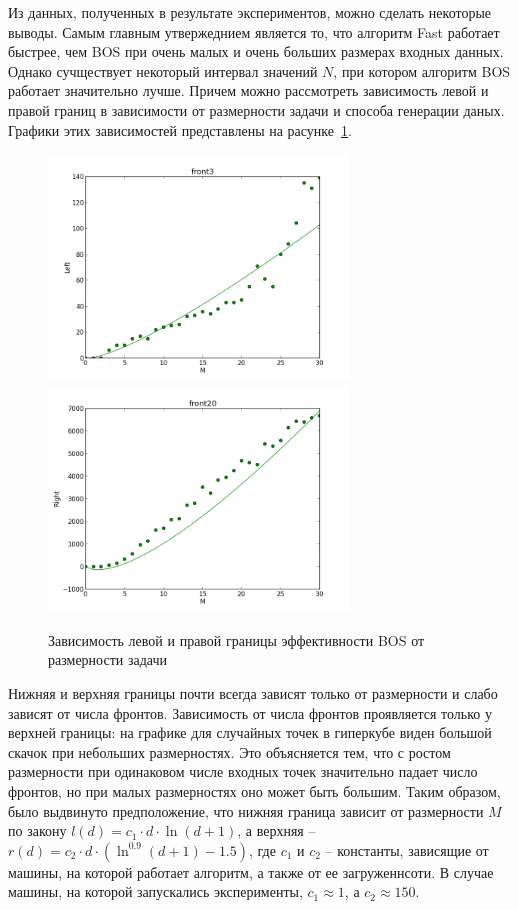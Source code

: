 Из данных, полученных в результате экспериментов, можно сделать некоторые выводы. Самым главным утвержеднием
является то, что алгоритм Fast работает быстрее, чем BOS при очень малых и очень больших размерах входных данных.
Однако сучществует некоторый интервал значений $N$, при котором алгоритм BOS работает значительно лучше. Причем
можно рассмотреть зависимость левой и правой границ в зависимости от размерности задачи и способа генерации даных.
Графики этих зависимостей представлены на расунке~\ref{borders}.

\begin{figure}
\begin{center}
\includegraphics[width=8cm]{pic/left.png}
\includegraphics[width=8cm]{pic/right.png}
\caption{Зависимость левой и правой границы эффективности BOS от размерности задачи}
\label{borders}%
\end{center}
\end{figure}

Нижняя и верхняя границы почти всегда зависят только от размерности и слабо зависят от числа фронтов. Зависимость
от числа фронтов проявляется только у верхней границы: на графике для случайных точек в гиперкубе виден большой
скачок при небольших размерностях. Это объясняется тем, что с ростом размерности при одинаковом числе входных
точек значительно падает число фронтов, но при малых размерностях оно может быть большим. Таким образом, было
выдвинуто предположение, что нижняя граница зависит от размерности $M$ по закону $l(d) = c_1 \cdot d \cdot \ln(d + 1)$,
а верхняя -- $r(d) = c_2 \cdot d \cdot (\ln^{0.9}(d + 1) - 1.5)$, где $c_1$  и $c_2$ -- константы, зависящие от
машины, на которой работает алгоритм, а также от ее загруженнсоти. В случае машины, на которой запускались
эксперименты, $c_1 \approx 1$, а $c_2 \approx 150$.


